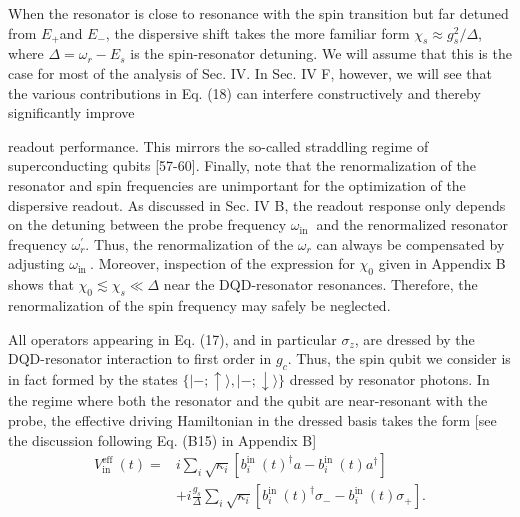 \documentclass[12pt]{article}
\begin{document}
When the resonator is close to resonance with the spin transition but far detuned from $E_{+}$and $E_{-}$, the dispersive shift takes the more familiar form $\chi_s \approx g_s^2 / \Delta$, where $\Delta=\omega_r-E_s$ is the spin-resonator detuning. We will assume that this is the case for most of the analysis of Sec. IV. In Sec. IV F, however, we will see that the various contributions in Eq. (18) can interfere constructively and thereby significantly improve

readout performance. This mirrors the so-called straddling regime of superconducting qubits [57-60]. Finally, note that the renormalization of the resonator and spin frequencies are unimportant for the optimization of the dispersive readout. As discussed in Sec. IV B, the readout response only depends on the detuning between the probe frequency $\omega_{\text {in }}$ and the renormalized resonator frequency $\omega_r^{\prime}$. Thus, the renormalization of the $\omega_r$ can always be compensated by adjusting $\omega_{\text {in }}$. Moreover, inspection of the expression for $\chi_0$ given in Appendix B shows that $\chi_0 \lesssim \chi_s \ll \Delta$ near the DQD-resonator resonances. Therefore, the renormalization of the spin frequency may safely be neglected.

All operators appearing in Eq. (17), and in particular $\sigma_z$, are dressed by the DQD-resonator interaction to first order in $g_c$. Thus, the spin qubit we consider is in fact formed by the states $\{|-; \uparrow\rangle,|-; \downarrow\rangle\}$ dressed by resonator photons. In the regime where both the resonator and the qubit are near-resonant with the probe, the effective driving Hamiltonian in the dressed basis takes the form [see the discussion following Eq. (B15) in Appendix B]
$$
\begin{aligned}
V_{\text {in }}^{\text {eff }}(t)= & i \sum_i \sqrt{\kappa_i}\left[b_i^{\text {in }}(t)^{\dagger} a-b_i^{\text {in }}(t) a^{\dagger}\right] \\
& +i \frac{g_s}{\Delta} \sum_i \sqrt{\kappa_i}\left[b_i^{\text {in }}(t)^{\dagger} \sigma_{-}-b_i^{\text {in }}(t) \sigma_{+}\right] .
\end{aligned}
$$
\end{document}
